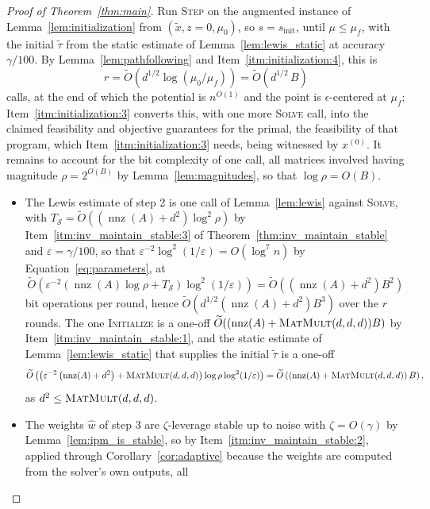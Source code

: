 \documentclass[11pt]{article}
\newcommand{\nnz}{\operatorname{nnz}}
\newcommand{\MM}{\textsc{MatMult}}
\renewcommand{\O}{\widetilde O}
\newcommand{\xini}{x^{(0)}}
\newcommand{\what}{\widehat{w}}
\newcommand{\tautil}{\widetilde{\tau}}
\begin{document}
\begin{proof}[Proof of Theorem~\ref{thm:main}]
Run \textsc{Step} on the augmented instance of
Lemma~\ref{lem:initialization} from $(\widetilde x, z = 0, \mu_0)$, so
$s = s_{\mathrm{init}}$, until
$\mu \le \mu_f$, with the initial
$\tautil$ from the static estimate of Lemma~\ref{lem:lewis_static} at
accuracy $\gamma / 100$. By Lemma~\ref{lem:pathfollowing} and
Item~\ref{itm:initialization:4}, this is
\[
r
=
\O\left( d^{1/2} \log(\mu_0 / \mu_f) \right)
=
\O\left( d^{1/2} \, B \right)
\]
calls, at the end of which the potential is $n^{O(1)}$ and the point is
$\epsilon$-centered at
$\mu_f$; Item~\ref{itm:initialization:3} converts this, with one more
\textsc{Solve} call, into the claimed feasibility and objective
guarantees for the primal, the feasibility of that
program, which Item~\ref{itm:initialization:3} needs, being witnessed
by $\xini$. It
remains to account for the bit complexity of one call, all matrices
involved having magnitude $\rho = 2^{O(B)}$ by
Lemma~\ref{lem:magnitudes}, so that $\log \rho = O(B)$.
\begin{itemize}
\item The Lewis estimate of step 2 is one call of Lemma~\ref{lem:lewis}
  against \textsc{Solve}, with
  $T_{\mathcal{S}} = \O((\nnz(A) + d^{2}) \log^{2} \rho)$ by
  Item~\ref{itm:inv_maintain_stable:3} of
  Theorem~\ref{thm:inv_maintain_stable} and
  $\varepsilon = \gamma / 100$, so that
  $\varepsilon^{-2} \log^{2}(1 / \varepsilon) = O(\log^{7} n)$ by
  Equation~\eqref{eq:parameters}, at
\[
\O\left( \varepsilon^{-2}
\left( \nnz(A) \log \rho + T_{\mathcal{S}} \right)
\log^{2}(1 / \varepsilon) \right)
=
\O\left( \left( \nnz(A) + d^{2} \right) B^{2} \right)
\]
bit operations per round, hence
$\O(d^{1/2} (\nnz(A) + d^{2}) B^{3})$ over the
$r$ rounds. The one
\textsc{Initialize} is a one-off
$\O((\nnz(A) + \MM(d, d, d)) B)$ by
Item~\ref{itm:inv_maintain_stable:1}, and the static estimate of
Lemma~\ref{lem:lewis_static} that supplies the initial
$\tautil$ is a one-off
\[
\O\left( \left( \varepsilon^{-2} \left( \nnz(A) + d^{2} \right)
+ \MM(d, d, d) \right) \log \rho \log^{2}(1 / \varepsilon) \right)
=
\O\left( \left( \nnz(A) + \MM(d, d, d) \right) B \right),
\]
as $d^{2} \le \MM(d, d, d)$.
\item The weights $\what$ of step 3 are
  $\zeta$-leverage stable up to noise with
  $\zeta = O(\gamma)$ by Lemma~\ref{lem:ipm_is_stable}, so by
  Item~\ref{itm:inv_maintain_stable:2}, applied through
  Corollary~\ref{cor:adaptive} because the weights are computed from the
  solver's own outputs, all

\end{itemize}
\end{proof}
\end{document}
